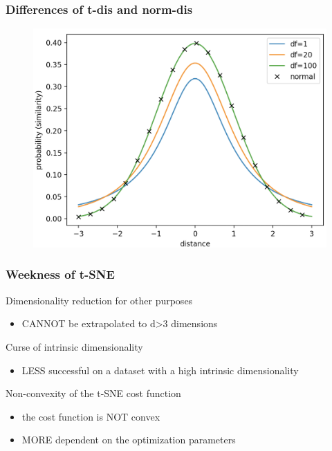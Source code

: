 \documentclass{beamer}
\begin{document}
\begin{frame}
  \frametitle{Differences of t-dis and norm-dis}
    \begin{figure}
        \centering
        \includegraphics[height=0.6\textheight]{images/figure4.png}
    \end{figure}

\end{frame}
%
%
%
%
%
%
\begin{frame}
  \frametitle{Weekness of t-SNE}
    Dimensionality reduction for other purposes
    \begin{itemize}
    \item CANNOT be extrapolated to d>3 dimensions
    \end{itemize}
    Curse of intrinsic dimensionality
    \begin{itemize}
    \item LESS successful on a dataset with a high intrinsic dimensionality
    \end{itemize}
    Non-convexity of the t-SNE cost function
    \begin{itemize}
    \item the cost function is NOT convex
    \item MORE dependent on the optimization parameters
    \end{itemize}
\end{frame}
\end{document}
